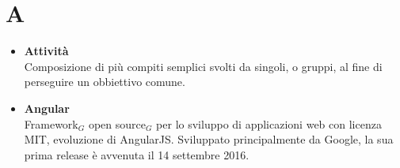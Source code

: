 \chapter{A} \label{A}
\begin{itemize}
		\item \textbf{Attività}\\
		Composizione di più compiti semplici svolti da singoli, o gruppi, al fine di perseguire un obbiettivo comune.
		
		\item \textbf{Angular} \\
		Framework$_G$ open source$_G$ per lo sviluppo di applicazioni web con licenza MIT, evoluzione di AngularJS. Sviluppato principalmente da Google, la sua prima release è avvenuta il 14 settembre 2016.
	\end{itemize}